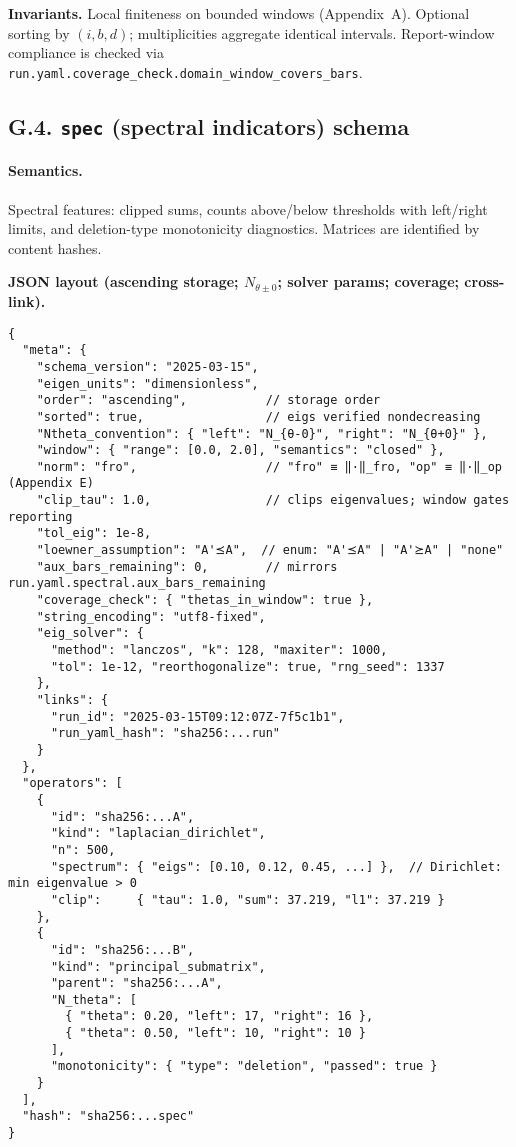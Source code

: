 \documentclass[11pt]{article}
\numberwithin{equation}{section}
\theoremstyle{definition}
\begin{document}
\noindent\textbf{Invariants.} Local finiteness on bounded windows (Appendix~A). Optional sorting by \((i,b,d)\);
multiplicities aggregate identical intervals. Report-window compliance is checked via
\nolinkurl{run.yaml.coverage_check.domain_window_covers_bars}.

\subsection*{G.4. \texttt{spec} (spectral indicators) schema}
\paragraph{Semantics.} Spectral features: clipped sums, counts above/below thresholds with left/right limits,
and deletion-type monotonicity diagnostics. Matrices are identified by content hashes.

\noindent\textbf{JSON layout (ascending storage; \(N_{\theta\pm 0}\); solver params; coverage; cross-link).}
\begin{verbatim}
{
  "meta": {
    "schema_version": "2025-03-15",
    "eigen_units": "dimensionless",
    "order": "ascending",           // storage order
    "sorted": true,                 // eigs verified nondecreasing
    "Ntheta_convention": { "left": "N_{θ-0}", "right": "N_{θ+0}" },
    "window": { "range": [0.0, 2.0], "semantics": "closed" },
    "norm": "fro",                  // "fro" ≡ ‖·‖_fro, "op" ≡ ‖·‖_op (Appendix E)
    "clip_tau": 1.0,                // clips eigenvalues; window gates reporting
    "tol_eig": 1e-8,
    "loewner_assumption": "A'⪯A",  // enum: "A'⪯A" | "A'⪰A" | "none"
    "aux_bars_remaining": 0,        // mirrors run.yaml.spectral.aux_bars_remaining
    "coverage_check": { "thetas_in_window": true },
    "string_encoding": "utf8-fixed",
    "eig_solver": {
      "method": "lanczos", "k": 128, "maxiter": 1000,
      "tol": 1e-12, "reorthogonalize": true, "rng_seed": 1337
    },
    "links": {
      "run_id": "2025-03-15T09:12:07Z-7f5c1b1",
      "run_yaml_hash": "sha256:...run"
    }
  },
  "operators": [
    {
      "id": "sha256:...A",
      "kind": "laplacian_dirichlet",
      "n": 500,
      "spectrum": { "eigs": [0.10, 0.12, 0.45, ...] },  // Dirichlet: min eigenvalue > 0
      "clip":     { "tau": 1.0, "sum": 37.219, "l1": 37.219 }
    },
    {
      "id": "sha256:...B",
      "kind": "principal_submatrix",
      "parent": "sha256:...A",
      "N_theta": [
        { "theta": 0.20, "left": 17, "right": 16 },
        { "theta": 0.50, "left": 10, "right": 10 }
      ],
      "monotonicity": { "type": "deletion", "passed": true }
    }
  ],
  "hash": "sha256:...spec"
}
\end{verbatim}
\end{document}
